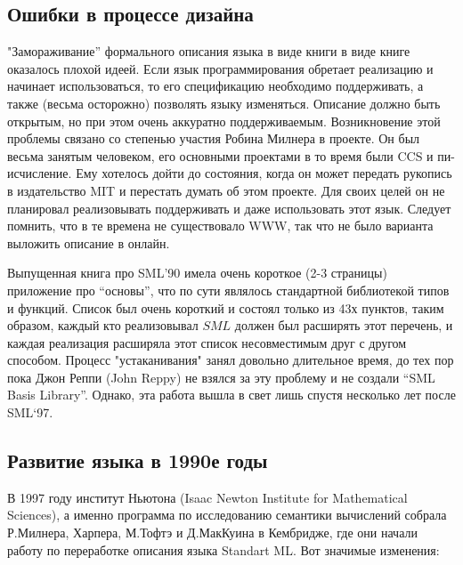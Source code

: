\documentclass[14pt]{matmex-diploma-custom}
\begin{document}

\subsection{Ошибки в процессе дизайна}
"Замораживание” формального описания языка в виде книги в виде книге оказалось плохой идеей. Если язык программирования обретает реализацию и начинает использоваться, то его спецификацию необходимо поддерживать, а также (весьма осторожно) позволять языку изменяться. Описание должно быть открытым, но при этом очень аккуратно поддерживаемым.
Возникновение этой проблемы связано со степенью участия Робина  Милнера в проекте. Он был весьма занятым человеком, его основными проектами в то время были CCS и пи-исчисление. Ему хотелось дойти до состояния, когда он может передать рукопись в издательство MIT  и перестать думать об этом проекте. Для своих целей он не планировал реализовывать поддерживать и даже использовать этот язык. Следует помнить, что в те времена не существовало WWW, так что не было варианта выложить описание в онлайн.

Выпущенная книга про SML’90 имела очень короткое (2-3 страницы) приложение про “основы”, что по сути являлось стандартной библиотекой типов и функций. Список был очень короткий и состоял только из 43х пунктов, таким образом, каждый кто реализовывал $SML$ должен был расширять этот перечень, и каждая реализация расширяла этот список несовместимым друг с другом способом. Процесс "устаканивания" занял довольно длительное время, до тех пор пока Джон Реппи (John Reppy) не взялся за эту проблему и не создали “SML Basis Library”. Однако, эта работа вышла в свет лишь спустя несколько лет после SML‘97.


\subsection{Развитие языка в 1990е годы}
В 1997 году институт Ньютона (Isaac Newton Institute for Mathematical Sciences), а именно программа по исследованию семантики вычислений собрала Р.Милнера, Харпера, М.Тофтэ и Д.МакКуина в Кембридже, где они начали работу по переработке описания языка Standart ML. Вот значимые изменения:
\end{document}
